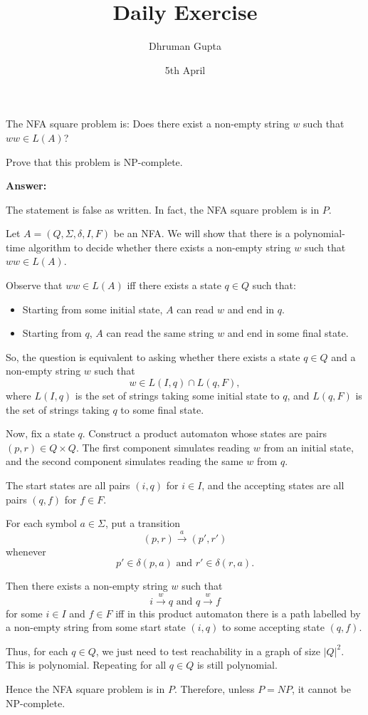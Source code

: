 \documentclass[11pt]{article}
\title{Daily Exercise}
\author{Dhruman Gupta}
\date{5th April}
\begin{document}

The NFA square problem is: Does there exist a non-empty string $w$ such that $ww \in L(A)$?

Prove that this problem is NP-complete. 

\textbf{Answer:}

The statement is false as written. In fact, the NFA square problem is in $P$.

Let $A = (Q, \Sigma, \delta, I, F)$ be an NFA. We will show that there is a polynomial-time algorithm to decide whether there exists a non-empty string $w$ such that $ww \in L(A)$.

Observe that $ww \in L(A)$ iff there exists a state $q \in Q$ such that:

\begin{itemize}
    \item Starting from some initial state, $A$ can read $w$ and end in $q$.
    \item Starting from $q$, $A$ can read the same string $w$ and end in some final state.
\end{itemize}

So, the question is equivalent to asking whether there exists a state $q \in Q$ and a non-empty string $w$ such that
\[
w \in L(I, q) \cap L(q, F),
\]
where $L(I, q)$ is the set of strings taking some initial state to $q$, and $L(q, F)$ is the set of strings taking $q$ to some final state.

Now, fix a state $q$. Construct a product automaton whose states are pairs $(p, r) \in Q \times Q$. The first component simulates reading $w$ from an initial state, and the second component simulates reading the same $w$ from $q$.

The start states are all pairs $(i, q)$ for $i \in I$, and the accepting states are all pairs $(q, f)$ for $f \in F$.

For each symbol $a \in \Sigma$, put a transition
\[
(p, r) \xrightarrow{a} (p', r')
\]
whenever
\[
p' \in \delta(p, a) \text{ and } r' \in \delta(r, a).
\]

Then there exists a non-empty string $w$ such that
\[
i \xrightarrow{w} q \text{ and } q \xrightarrow{w} f
\]
for some $i \in I$ and $f \in F$ iff in this product automaton there is a path labelled by a non-empty string from some start state $(i, q)$ to some accepting state $(q, f)$.

Thus, for each $q \in Q$, we just need to test reachability in a graph of size $|Q|^2$. This is polynomial. Repeating for all $q \in Q$ is still polynomial.

Hence the NFA square problem is in $P$. Therefore, unless $P = NP$, it cannot be NP-complete.
\end{document}

